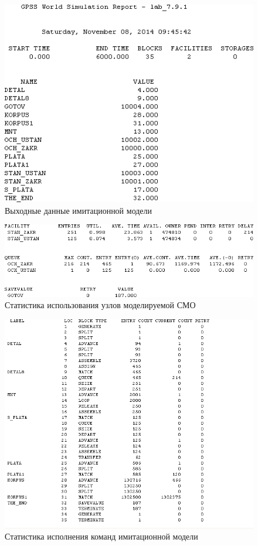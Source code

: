 \begin{figure}[h!]
  \centering
  \includegraphics[width=0.8\linewidth]{pic/report_1}
  \caption{Выходные данные имитационной модели}
  \label{pic:report_1}
\end{figure}

\begin{figure}[h!]
  \centering
  \includegraphics[width=1\linewidth]{pic/report_3}
  \caption{Статистика использования узлов моделируемой СМО}
  \label{pic:report_stat}
\end{figure}

\begin{figure}[h!]
  \centering
  \includegraphics[width=0.8\linewidth]{pic/report_2}
  \caption{Статистика исполнения команд имитационной модели}
  \label{pic:report_2}
\end{figure}

\newpage
